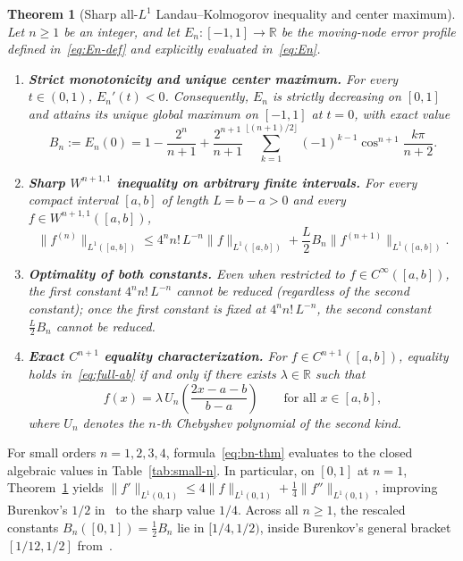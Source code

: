 \documentclass[11pt,a4paper]{article}
\newcommand{\R}{\mathbb{R}}
\newtheorem{theorem}{Theorem}
\theoremstyle{remark}
\numberwithin{equation}{section}
\begin{document}
\begin{theorem}[Sharp all-$L^1$ Landau--Kolmogorov inequality and center maximum]
    \label{thm:full}
    Let $n \ge 1$ be an integer, and let $E_n : [-1,1] \to \R$ be the moving-node error profile defined in~\eqref{eq:En-def} and explicitly evaluated in~\eqref{eq:En}.
    \begin{enumerate}[label=\textup{(\roman*)}]
        \item \textbf{Strict monotonicity and unique center maximum.}
        For every $t \in (0,1)$, $E_n'(t) < 0$. Consequently, $E_n$ is strictly decreasing on $[0,1]$ and attains its unique global maximum on $[-1,1]$ at $t = 0$, with exact value
        \begin{equation}
            B_n := E_n(0)
            = 1 - \frac{2^n}{n+1}
              + \frac{2^{n+1}}{n+1}\sum_{k=1}^{\lfloor(n+1)/2\rfloor}(-1)^{k-1}\cos^{n+1}\frac{k\pi}{n+2}.
            \label{eq:bn-thm}
        \end{equation}
        \item \textbf{Sharp $W^{n+1,1}$ inequality on arbitrary finite intervals.}
        For every compact interval $[a,b]$ of length $L = b - a > 0$ and every $f \in W^{n+1,1}([a,b])$,
        \begin{equation}
            \lVert f^{(n)}\rVert_{L^1([a,b])}
            \le 4^n n!\,L^{-n}\lVert f\rVert_{L^1([a,b])}
              + \frac{L}{2}B_n\lVert f^{(n+1)}\rVert_{L^1([a,b])}.
            \label{eq:full-ab}
        \end{equation}
        \item \textbf{Optimality of both constants.}
        Even when restricted to $f \in C^\infty([a,b])$, the first constant $4^n n!\,L^{-n}$ cannot be reduced (regardless of the second constant); once the first constant is fixed at $4^n n!\,L^{-n}$, the second constant $\frac{L}{2}B_n$ cannot be reduced.
        \item \textbf{Exact $C^{n+1}$ equality characterization.}
        For $f \in C^{n+1}([a,b])$, equality holds in~\eqref{eq:full-ab} if and only if there exists $\lambda \in \R$ such that
        \[
            f(x) = \lambda\, U_n\!\left(\frac{2x - a - b}{b - a}\right)
            \qquad \text{for all } x \in [a,b],
        \]
        where $U_n$ denotes the $n$-th Chebyshev polynomial of the second kind.
    \end{enumerate}
\end{theorem}

For small orders $n = 1, 2, 3, 4$, formula~\eqref{eq:bn-thm} evaluates to the closed algebraic values in Table~\ref{tab:small-n}. In particular, on $[0,1]$ at $n = 1$, Theorem~\ref{thm:full} yields $\lVert f'\rVert_{L^1(0,1)} \le 4\lVert f\rVert_{L^1(0,1)} + \frac14\lVert f''\rVert_{L^1(0,1)}$, improving Burenkov's $1/2$ in~\cite[eq.~(24)]{Burenkov1980} to the sharp value $1/4$. Across all $n \ge 1$, the rescaled constants $B_n([0,1]) = \frac12 B_n$ lie in $[1/4, 1/2)$, inside Burenkov's general bracket $[1/12, 1/2]$ from~\cite[p.~29]{Burenkov1980}.
\end{document}
